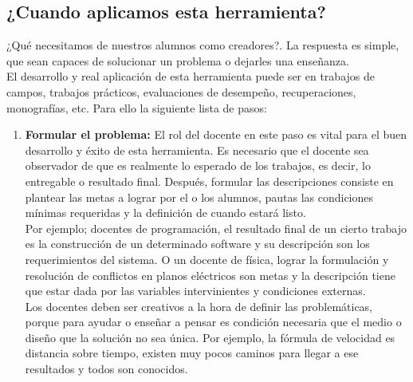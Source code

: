 \subsection{¿Cuando aplicamos esta herramienta?}
¿Qu\'e necesitamos de nuestros alumnos como creadores?. La respuesta es simple, que sean capaces de solucionar un problema o dejarles una ense\~nanza.\\
El desarrollo y real aplicaci\'on de esta herramienta puede ser en trabajos de campos, trabajos pr\'acticos, evaluaciones de desempe\~no, recuperaciones, 
monograf\'ias, etc. Para ello la siguiente lista de pasos:\\
\begin{enumerate}
 \item \textbf{Formular el problema:}
 El rol del docente en este paso es vital para el buen desarrollo y \'exito de esta herramienta. Es necesario que el docente sea observador de que es realmente
 lo esperado de los trabajos, es decir, lo entregable o resultado final. Despu\'es, formular las descripciones consiste en plantear las metas a lograr por el o 
 los alumnos, pautas las condiciones m\'inimas requeridas y la definici\'on de cuando estar\'a listo.\\
 Por ejemplo; docentes de programaci\'on, el resultado final de un cierto trabajo es la construcci\'on de un determinado software y su descripci\'on son los 
 requerimientos del sistema. O un docente de f\'isica, lograr la formulaci\'on y resoluci\'on de conflictos en planos el\'ectricos son metas y la descripci\'on
 tiene que estar dada por las variables intervinientes y condiciones externas.\\ 
 Los docentes deben ser creativos a la hora de definir las problem\'aticas, porque para ayudar o ense\~nar a pensar es condici\'on necesaria que el medio o 
 dise\~no que la soluci\'on no sea \'unica. Por ejemplo, la f\'ormula de velocidad es distancia sobre tiempo, existen muy pocos caminos para llegar a ese 
 resultados y todos son conocidos. 
 

\end{enumerate}
